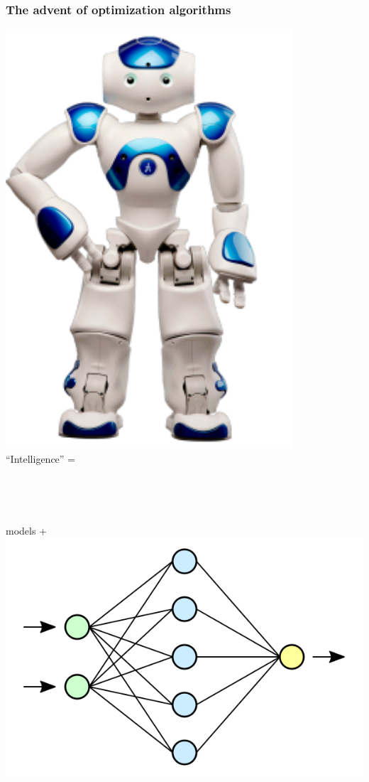 \documentclass[12pt]{beamer}
\begin{document}
\begin{frame}
\frametitle{The advent of optimization algorithms}
\begin{minipage}[b]{0.25\textwidth}
\centering
\includegraphics[width=0.8\textwidth]{Figures/NAO.png}
\\ ``Intelligence'' =
\end{minipage} 
\hfill
\begin{minipage}[b]{0.2\textwidth}
{\scriptsize \cite{bachoptimization}}
\vskip 3cm
~
\end{minipage} 
\\
\hfill
\begin{minipage}[t]{0.2\textwidth}
\centering
 models + 
\\
\includegraphics[width=\textwidth]{Figures/neural_network.png} 

\end{minipage}
\end{frame}
\end{document}
